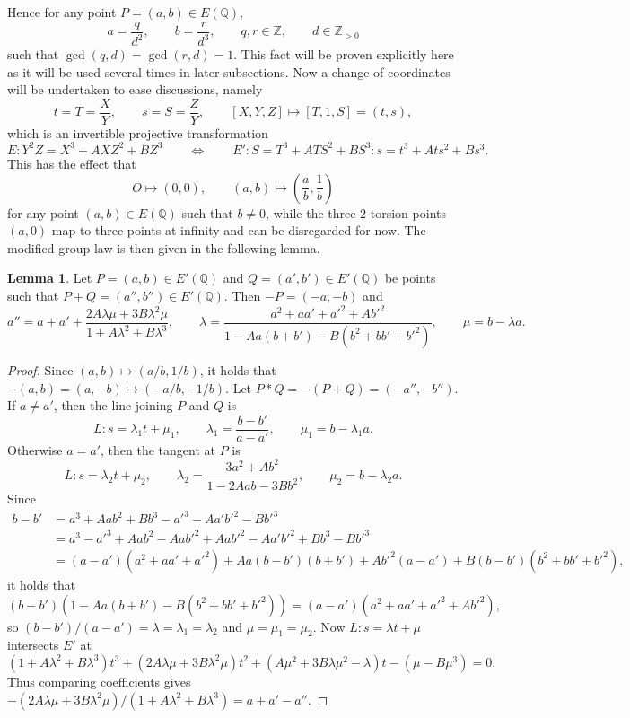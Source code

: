 \documentclass{article}
\newcommand{\Z}{\mathbb{Z}}
\newcommand{\Q}{\mathbb{Q}}
\newcommand{\rb}[1]{\left( #1 \right)}
\renewcommand{\sb}[1]{\left[ #1 \right]}
\theoremstyle{definition}\newtheorem*{definition}{Definition}
\theoremstyle{definition}\newtheorem*{example}{Example}
\theoremstyle{definition}\newtheorem*{remark}{Remark}
\newtheorem{lemma}[proposition]{Lemma}
\begin{document}
Hence for any point $ P = \rb{a, b} \in E\rb{\Q} $,
$$ a = \dfrac{q}{d^2}, \qquad b = \dfrac{r}{d^3}, \qquad q, r \in \Z, \qquad d \in \Z_{> 0} $$
such that $ \gcd\rb{q, d} = \gcd\rb{r, d} = 1 $. This fact will be proven explicitly here as it will be used several times in later subsections. Now a change of coordinates will be undertaken to ease discussions, namely
$$ t = T = \dfrac{X}{Y}, \qquad s = S = \dfrac{Z}{Y}, \qquad \sb{X, Y, Z} \mapsto \sb{T, 1, S} = \rb{t, s}, $$
which is an invertible projective transformation
$$ E : Y^2Z = X^3 + AXZ^2 + BZ^3 \qquad \iff \qquad E' : S = T^3 + ATS^2 + BS^3 : s = t^3 + Ats^2 + Bs^3. $$
This has the effect that
$$ O \mapsto \rb{0, 0}, \qquad \rb{a, b} \mapsto \rb{\dfrac{a}{b}, \dfrac{1}{b}} $$
for any point $ \rb{a, b} \in E\rb{\Q} $ such that $ b \ne 0 $, while the three $ 2 $-torsion points $ \rb{a, 0} $ map to three points at infinity and can be disregarded for now. The modified group law is then given in the following lemma.

\begin{lemma}
Let $ P = \rb{a, b} \in E'\rb{\Q} $ and $ Q = \rb{a', b'} \in E'\rb{\Q} $ be points such that $ P + Q = \rb{a'', b''} \in E'\rb{\Q} $. Then $ -P = \rb{-a, -b} $ and
$$ a'' = a + a' + \dfrac{2A\lambda\mu + 3B\lambda^2\mu}{1 + A\lambda^2 + B\lambda^3}, \qquad \lambda = \dfrac{a^2 + aa' + a'^2 + Ab'^2}{1 - Aa\rb{b + b'} - B\rb{b^2 + bb' + b'^2}}, \qquad \mu = b - \lambda a. $$
\end{lemma}

\begin{proof}
Since $ \rb{a, b} \mapsto \rb{a / b, 1 / b} $, it holds that $ -\rb{a, b} = \rb{a, -b} \mapsto \rb{-a / b, -1 / b} $. Let $ P * Q = -\rb{P + Q} = \rb{-a'', -b''} $. If $ a \ne a' $, then the line joining $ P $ and $ Q $ is
$$ L : s = \lambda_1 t + \mu_1, \qquad \lambda_1 = \dfrac{b - b'}{a - a'}, \qquad \mu_1 = b - \lambda_1 a. $$
Otherwise $ a = a' $, then the tangent at $ P $ is
$$ L : s = \lambda_2 t + \mu_2, \qquad \lambda_2 = \dfrac{3a^2 + Ab^2}{1 - 2Aab - 3Bb^2}, \qquad \mu_2 = b - \lambda_2 a. $$
Since
\begin{align*}
b - b'
& = a^3 + Aab^2 + Bb^3 - a'^3 - Aa'b'^2 - Bb'^3 \\
& = a^3 - a'^3 + Aab^2 - Aab'^2 + Aab'^2 - Aa'b'^2 + Bb^3 - Bb'^3 \\
& = \rb{a - a'}\rb{a^2 + aa' + a'^2} + Aa\rb{b - b'}\rb{b + b'} + Ab'^2\rb{a - a'} + B\rb{b - b'}\rb{b^2 + bb' + b'^2},
\end{align*}
it holds that
$$ \rb{b - b'}\rb{1 - Aa\rb{b + b'} - B\rb{b^2 + bb' + b'^2}} = \rb{a - a'}\rb{a^2 + aa' + a'^2 + Ab'^2}, $$
so $ \rb{b - b'} / \rb{a - a'} = \lambda = \lambda_1 = \lambda_2 $ and $ \mu = \mu_1 = \mu_2 $. Now $ L : s = \lambda t + \mu $ intersects $ E' $ at
$$ \rb{1 + A\lambda^2 + B\lambda^3}t^3 + \rb{2A\lambda\mu + 3B\lambda^2\mu}t^2 + \rb{A\mu^2 + 3B\lambda\mu^2 - \lambda}t - \rb{\mu - B\mu^3} = 0. $$
Thus comparing coefficients gives $ -\rb{2A\lambda\mu + 3B\lambda^2\mu} / \rb{1 + A\lambda^2 + B\lambda^3} = a + a' - a'' $.
\end{proof}
\end{document}
